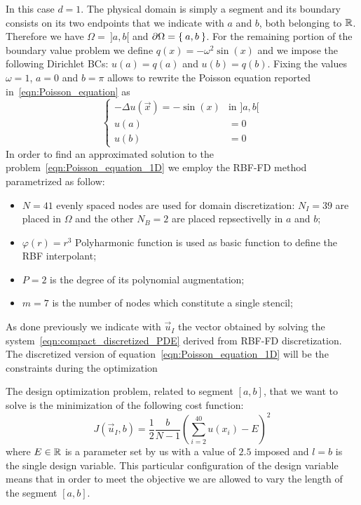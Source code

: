In this case $d=1$. The physical domain is simply a segment and its boundary consists on its two endpoints that we indicate with $a$ and $b$, both belonging to $\mathbb{R}$. Therefore we have $\Omega =~]a,b[$ and $\partial\Omega = \Set{a, b}$.
For the remaining portion of the boundary value problem we define $q(x) = - \omega^2 \sin(x)$ and we impose the following Dirichlet BCs: $u(a)=q(a)$ and $u(b)=q(b)$. Fixing the values $\omega=1$, $a=0$ and $b=\pi$ allows to rewrite the Poisson equation reported in~\eqref{eqn:Poisson_equation} as
\begin{equation}
	\label{eqn:Poisson_equation_1D}
	\begin{cases}
		- \Delta u(\vec{x}) = - \sin(x)  &  \text{in $]a,b[$}  \\
		u(a) &= 0  \\
		u(b) &= 0
	\end{cases}
\end{equation}
In order to find an approximated solution to the problem~\eqref{eqn:Poisson_equation_1D} we employ the RBF-FD method parametrized as follow:
\begin{itemize}
	\item $N=41$ evenly spaced nodes are used for domain discretization: $N_I=39$ are placed in $\Omega$ and the other $N_B=2$ are placed repsectivelly in $a$ and $b$;
	\item $\varphi(r) = r^3$ Polyharmonic function is used as basic function to define the RBF interpolant;
	\item $P=2$ is the degree of its polynomial augmentation;
	\item $m=7$ is the number of nodes which constitute a single stencil;
\end{itemize}
As done previously we indicate with $\vec{u}_I$ the vector obtained by solving the system~\eqref{eqn:compact_discretized_PDE} derived from RBF-FD discretization.
The discretized version of equation~\eqref{eqn:Poisson_equation_1D} will be the constraints during the optimization

\smallskip
The design optimization problem, related to segment $[a,b]$, that we want to solve is the minimization of the following cost function:
\begin{equation}
	J(\vec{u}_I, b) = \frac{1}{2} \frac{b}{N-1} \left( \sum_{i=2}^{40} u(x_i) - E \right)^2
\end{equation}
where $E\in\mathbb{R}$ is a parameter set by us with a value of $2.5$ imposed and $l=b$ is the single design variable. This particular configuration of the design variable means that in order to meet the objective we are allowed to vary the length of the segment $[a,b]$.

